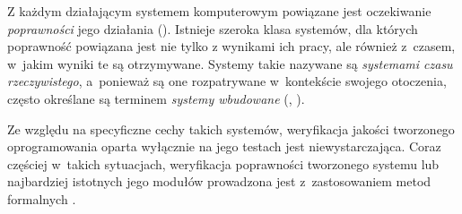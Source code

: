 \documentclass[a4paper,11pt]{article}
\begin{document}

Z każdym działającym systemem komputerowym powiązane jest oczekiwanie 
{\em poprawności} jego działania (\cite{Sommerville:2006:SE:1196763}). Istnieje szeroka 
klasa systemów, dla których poprawność powiązana jest nie tylko z 
wynikami ich pracy, ale również z~czasem, w~jakim wyniki te są 
otrzymywane. Systemy takie nazywane są {\em systemami czasu 
rzeczywistego}, a~ponieważ są one rozpatrywane  w~kontekście swojego 
otoczenia, często określane są terminem {\em systemy wbudowane} 
(\cite{Sommerville:2006:SE:1196763}, \cite{Szmuc:etal:MFwIO:15}). 

Ze względu na specyficzne cechy takich systemów, weryfikacja jakości 
tworzonego oprogramowania oparta wyłącznie na jego testach jest 
niewystarczająca. Coraz częściej w~takich sytuacjach, weryfikacja 
poprawności tworzonego systemu lub najbardziej istotnych jego 
modułów prowadzona jest z~zastosowaniem metod formalnych 
\cite{Alur:1990:AMR:90397.90438, Szmuc:etal:MFwIO:15}. 


\end{document}
